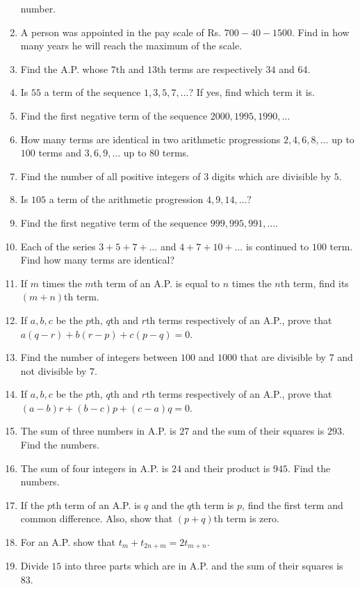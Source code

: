 \begin{enumerate}
  number.
\item A person was appointed in the pay scale of Rs. $700 - 40 - 1500$. Find in how many years he will reach the maximum of the
  scale.
\item Find the A.P. whose $7$th and $13$th terms are respectively $34$ and $64$.
\item Is $55$ a term of the sequence $1, 3, 5, 7, \ldots$? If yes, find which term it is.
\item Find the first negative term of the sequence $2000, 1995, 1990, \ldots$
\item How many terms are identical in two arithmetic progressions $2, 4, 6, 8, \ldots$ up to $100$ terms and $3, 6, 9, \ldots$ up
  to $80$ terms.
\item Find the number of all positive integers of $3$ digits which are divisible by $5$.
\item Is $105$ a term of the arithmetic progression $4, 9, 14, \ldots?$
\item Find the first negative term of the sequence $999, 995, 991, \ldots$.
\item Each of the series $3 + 5 + 7 + \ldots$ and $4 + 7 + 10 + \ldots$ is continued to $100$ term. Find how many terms are
  identical?
\item If $m$ times the $m$th term of an A.P. is equal to $n$ times the $n$th term, find its $(m + n)$th term.
\item If $a, b, c$ be the $p$th, $q$th and $r$th terms respectively of an A.P., prove that $a(q - r) + b(r - p) + c(p - q) =
  0$.
\item Find the number of integers between $100$ and $1000$ that are divisible by $7$ and not divisible by $7$.
\item If $a, b, c$ be the $p$th, $q$th and $r$th terms respectively of an A.P., prove that $(a - b)r + (b - c)p + (c - a)q =
  0$.
\item The sum of three numbers in A.P. is $27$ and the sum of their squares is $293.$ Find the numbers.
\item The sum of four integers in A.P. is $24$ and their product is $945.$ Find the numbers.
\item If the $p$th term of an A.P. is $q$ and the $q$th term is $p$, find the first term and common difference. Also, show that $(p
  + q)$th term is zero.
\item For an A.P. show that $t_m + t_{2n + m} = 2t_{m + n}$.
\item Divide $15$ into three parts which are in A.P. and the sum of their squares is $83$.

\end{enumerate}
